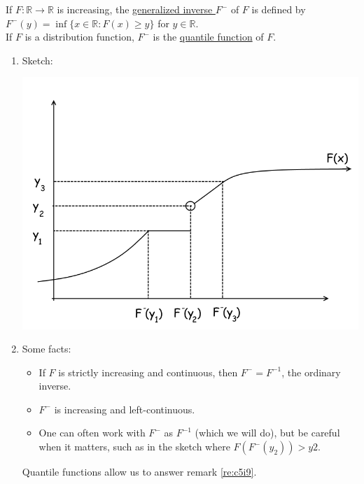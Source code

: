\documentclass{article}
\newcommand{\R}{\mathbb{R}}
\newcommand{\inv}{^{-1}}
\begin{document}
	\begin{mydef}{}{}
		If $F : \R\to\R$ is increasing, the \underline{generalized inverse $F^-$} of $F$ is defined by $F^-(y)=\inf\{x\in\R : F(x)\geq y\}$ for $y\in\R$.\\
		
		If $F$ is a distribution function, $F^-$ is the \underline{quantile function} of $F$. 
	\end{mydef}
	
	\begin{myrem}{}{}
		\begin{enumerate}
			\item Sketch:
			
			\includegraphics[scale=.5]{graph1.png}
			
			\item Some facts:
			\begin{itemize}
				\item If $F$ is strictly increasing and continuous, then $F^-=F\inv$, the ordinary inverse.
				\item $F^-$ is increasing and left-continuous.
				\item One can often work with $F^-$ as $F\inv$ (which we will do), but be careful when it matters, such as in the sketch where $F(F^-(y_2))>y2$.
			\end{itemize}
			Quantile functions allow us to answer remark \ref{re:c5i9}.
		\end{enumerate}
	\end{myrem}
	
\end{document}
